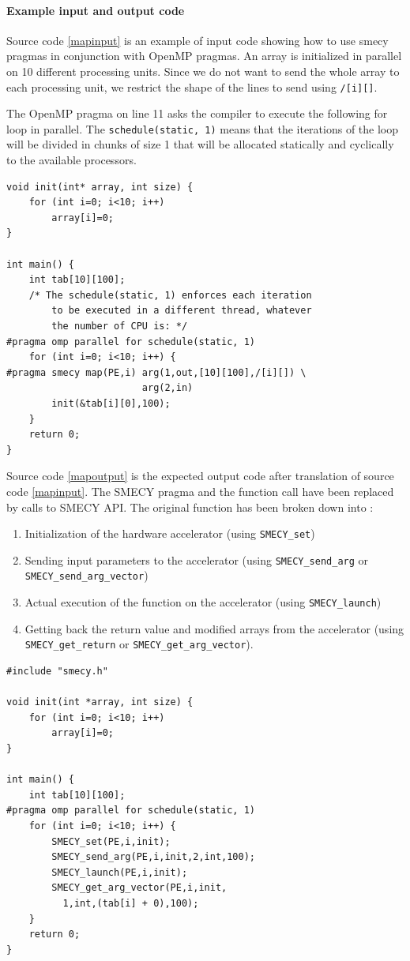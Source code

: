 \documentclass[a4paper]{article}
\begin{document}
	\paragraph{Example input and output code}
	Source code \ref{mapinput} is an example of input code showing how to use smecy pragmas in conjunction with OpenMP pragmas. An array is initialized in parallel on 10 different processing units. Since we do not want to send the whole array to each processing unit, we restrict the shape of the lines to send using \verb+/[i][]+.
	
	The OpenMP pragma on line 11 asks the compiler to execute the following for loop in parallel. The \verb+schedule(static, 1)+ means that the iterations of the loop will be divided in chunks of size 1 that will be allocated statically and cyclically to the available processors.
	
	\begin{lstlisting}[label=mapinput,caption={Input code with hardware mapping pragma.}]
void init(int* array, int size) {
	for (int i=0; i<10; i++)
		array[i]=0;
}

int main() {
	int tab[10][100];
    /* The schedule(static, 1) enforces each iteration
        to be executed in a different thread, whatever
        the number of CPU is: */
#pragma omp parallel for schedule(static, 1)
	for (int i=0; i<10; i++) {
#pragma smecy map(PE,i) arg(1,out,[10][100],/[i][]) \
                        arg(2,in)
		init(&tab[i][0],100);
	}
	return 0;
}
	\end{lstlisting}
	
	Source code \ref{mapoutput} is the expected output code after translation of source code \ref{mapinput}. The SMECY pragma and the function call have been replaced by calls to SMECY API. The original function has been broken down into :
	\begin{enumerate}
		\item Initialization of the hardware accelerator (using \verb+SMECY_set+)
		\item Sending input parameters to the accelerator (using \verb+SMECY_send_arg+ or \verb+SMECY_send_arg_vector+)
		\item Actual execution of the function on the accelerator (using \verb+SMECY_launch+)
		\item Getting back the return value and modified arrays from the accelerator (using \verb+SMECY_get_return+ or \verb+SMECY_get_arg_vector+).
	\end{enumerate}
	
	\begin{lstlisting}[label=mapoutput,caption={Expected output code.}]
#include "smecy.h"

void init(int *array, int size) {
	for (int i=0; i<10; i++)
		array[i]=0;
}

int main() {
	int tab[10][100];
#pragma omp parallel for schedule(static, 1)
	for (int i=0; i<10; i++) {
		SMECY_set(PE,i,init);
		SMECY_send_arg(PE,i,init,2,int,100);
		SMECY_launch(PE,i,init);
		SMECY_get_arg_vector(PE,i,init,
		  1,int,(tab[i] + 0),100);
	}
	return 0;
}
	\end{lstlisting}
	
\end{document}
